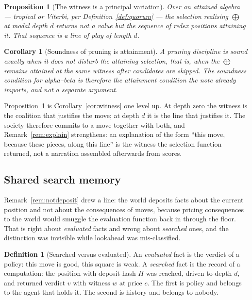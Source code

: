 \documentclass[11pt,a4paper]{article}
\theoremstyle{plain}
\newtheorem{proposition}[theorem]{Proposition}
\newtheorem{corollary}[theorem]{Corollary}
\theoremstyle{definition}
\newtheorem{definition}[theorem]{Definition}
\theoremstyle{remark}
\begin{document}
\begin{proposition}[The witness is a principal variation]
\label{prop:pv}
Over an attained algebra --- tropical or Viterbi, per
Definition~\ref{def:quorum} --- the selection realising $\bigoplus$ at modal
depth $d$ returns not a value but the sequence of redex positions attaining it.
That sequence is a line of play of length $d$.
\end{proposition}

\begin{corollary}[Soundness of pruning is attainment]
\label{cor:prunesound}
A pruning discipline is sound exactly when it does not disturb the attaining
selection, that is, when the $\bigoplus$ remains attained at the same witness
after candidates are skipped. The soundness condition for alpha--beta is
therefore the attainment condition the note already imports, and not a separate
argument.
\end{corollary}

Proposition~\ref{prop:pv} is Corollary~\ref{cor:witness} one level up. At depth
zero the witness is the coalition that justifies the move; at depth $d$ it is
the line that justifies it. The society therefore commits to a move together
with both, and Remark~\ref{rem:explain} strengthens: an explanation of the form
``this move, because these pieces, along this line'' is the witness the
selection function returned, not a narration assembled afterwards from scores.

\subsection{Shared search memory}
\label{sec:shared}

Remark~\ref{rem:notdeposit} drew a line: the world deposits facts about the
current position and not about the consequences of moves, because pricing
consequences to the world would smuggle the evaluation function back in through
the floor. That is right about \emph{evaluated} facts and wrong about
\emph{searched} ones, and the distinction was invisible while lookahead was
mis-classified.

\begin{definition}[Searched versus evaluated]
\label{def:searchvseval}
An \emph{evaluated} fact is the verdict of a policy: this move is good, this
square is weak. A \emph{searched} fact is the record of a computation: the
position with deposit-hash $H$ was reached, driven to depth $d$, and returned
verdict $v$ with witness $w$ at price $c$. The first is policy and belongs to
the agent that holds it. The second is history and belongs to nobody.
\end{definition}
\end{document}
